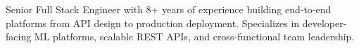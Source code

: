 
\begin{cvparagraph}
Senior Full Stack Engineer with 8+ years of experience building end-to-end platforms from API design to production deployment. Specializes in developer-facing ML platforms, scalable REST APIs, and cross-functional team leadership.
\end{cvparagraph}
